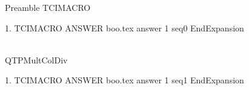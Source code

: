Preamble
TCIMACRO
\begin{ExerciseList}
\item[1.]
TCIMACRO
ANSWER
boo.tex answer 1 seq0
EndExpansion
\end{ExerciseList}
\\QTP{MultColDiv}
\begin{ExerciseList}
\item[1.]
TCIMACRO
ANSWER
boo.tex answer 1 seq1
EndExpansion
\end{ExerciseList}
